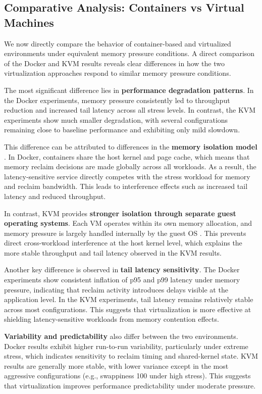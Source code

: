 \documentclass[conference]{IEEEtran}
\begin{document}
\subsection{Comparative Analysis: Containers vs Virtual Machines}
We now directly compare the behavior of container-based and virtualized environments under equivalent memory pressure conditions. A direct comparison of the Docker and KVM results reveals clear differences in how the two virtualization approaches respond to similar memory pressure conditions.

The most significant difference lies in \textbf{performance degradation patterns}. In the Docker experiments, memory pressure consistently led to throughput reduction and increased tail latency across all stress levels. In contrast, the KVM experiments show much smaller degradation, with several configurations remaining close to baseline performance and exhibiting only mild slowdown.

This difference can be attributed to differences in the \textbf{memory isolation model} \cite{linux_cgroup_memory_controller}. In Docker, containers share the host kernel and page cache, which means that memory reclaim decisions are made globally across all workloads. As a result, the latency-sensitive service directly competes with the stress workload for memory and reclaim bandwidth. This leads to interference effects such as increased tail latency and reduced throughput.

In contrast, KVM provides \textbf{stronger isolation through separate guest operating systems}. Each VM operates within its own memory allocation, and memory pressure is largely handled internally by the guest OS \cite{kivity2007kvm , WaldspurgerProceedingsOT}. This prevents direct cross-workload interference at the host kernel level, which explains the more stable throughput and tail latency observed in the KVM results.

Another key difference is observed in \textbf{tail latency sensitivity}. The Docker experiments show consistent inflation of p95 and p99 latency under memory pressure, indicating that reclaim activity introduces delays visible at the application level. In the KVM experiments, tail latency remains relatively stable across most configurations. This suggests that virtualization is more effective at shielding latency-sensitive workloads from memory contention effects.

\textbf{Variability and predictability} also differ between the two environments. Docker results exhibit higher run-to-run variability, particularly under extreme stress, which indicates sensitivity to reclaim timing and shared-kernel state. KVM results are generally more stable, with lower variance except in the most aggressive configurations (e.g., swappiness 100 under high stress). This suggests that virtualization improves performance predictability under moderate pressure.
\end{document}
